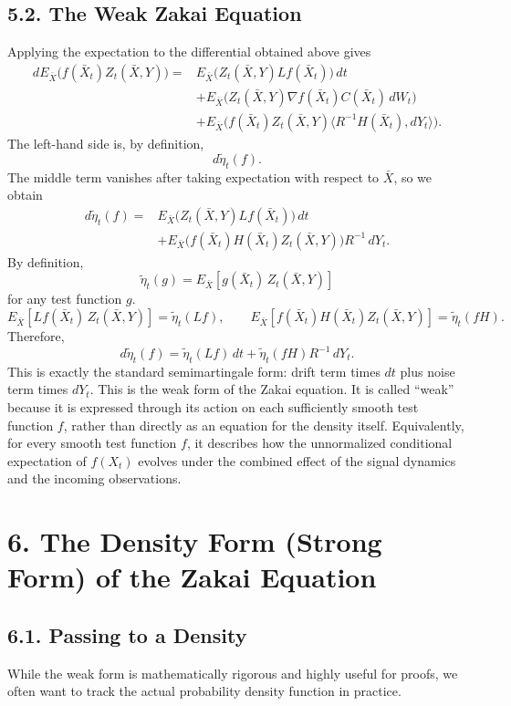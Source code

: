 \documentclass[11pt]{article}
\theoremstyle{definition}
\theoremstyle{remark}
\begin{document}
\subsection*{5.2. The Weak Zakai Equation}
Applying the expectation to the differential obtained above gives
\[
\begin{aligned}
dE_{\bar X}\bigl(f(\bar X_t)Z_t(\bar X,Y)\bigr)
= {} & E_{\bar X}\bigl(Z_t(\bar X,Y)Lf(\bar X_t)\bigr)\,dt \\
& + E_{\bar X}\bigl(Z_t(\bar X,Y)\nabla f(\bar X_t)C(\bar X_t)\,dW_t\bigr) \\
& + E_{\bar X}\bigl(f(\bar X_t)Z_t(\bar X,Y)\langle R^{-1}H(\bar X_t),dY_t\rangle\bigr).
\end{aligned}
\]
The left-hand side is, by definition,
\[
d\tilde \eta_t(f).
\]
The middle term vanishes after taking expectation with respect to $\bar X$, so we obtain
\[
\begin{aligned}
d\tilde \eta_t(f)
= {} & E_{\bar X}\bigl(Z_t(\bar X,Y)Lf(\bar X_t)\bigr)\,dt \\
& + E_{\bar X}\bigl(f(\bar X_t)H(\bar X_t)Z_t(\bar X,Y)\bigr)R^{-1}\,dY_t.
\end{aligned}
\]
By definition,
\[
\tilde \eta_t(g)=E_{\bar X}[g(\bar X_t)\,Z_t(\bar X,Y)]
\]
for any test function $g$.
\[
E_{\bar X}[Lf(\bar X_t)\,Z_t(\bar X,Y)]=\tilde \eta_t(Lf),
\qquad
E_{\bar X}[f(\bar X_t)H(\bar X_t)Z_t(\bar X,Y)]=\tilde \eta_t(fH).
\]
Therefore,
\[
d\tilde \eta_t(f)=\tilde \eta_t(Lf)\,dt+\tilde \eta_t(fH)R^{-1}\,dY_t.
\]
This is exactly the standard semimartingale form: drift term times $dt$ plus noise term times $dY_t$.
This is the weak form of the Zakai equation. It is called ``weak'' because it is expressed through its action on each sufficiently smooth test function $f$, rather than directly as an equation for the density itself. Equivalently, for every smooth test function $f$, it describes how the unnormalized conditional expectation of $f(X_t)$ evolves under the combined effect of the signal dynamics and the incoming observations.

\section*{6. The Density Form (Strong Form) of the Zakai Equation}

\subsection*{6.1. Passing to a Density}
While the weak form is mathematically rigorous and highly useful for proofs, we often want to track the actual probability density function in practice.
\end{document}
